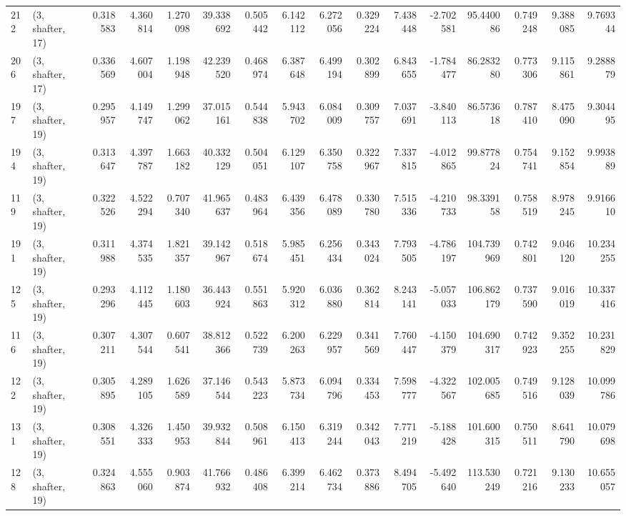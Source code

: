 \begin{tabular}{llrrrrrrrrrrrrrr}
212 &  (3, shafter, 17) &   0.318583 &   4.360814 &  1.270098 &   39.338692 &  0.505442 &   6.142112 &   6.272056 &  0.329224 &   7.438448 &  -2.702581 &   95.440086 &  0.749248 &   9.388085 &   9.769344 \\
206 &  (3, shafter, 17) &   0.336569 &   4.607004 &  1.198948 &   42.239520 &  0.468974 &   6.387648 &   6.499194 &  0.302899 &   6.843655 &  -1.784477 &   86.283280 &  0.773306 &   9.115861 &   9.288879 \\
197 &  (3, shafter, 19) &   0.295957 &   4.149747 &  1.299062 &   37.015161 &  0.544838 &   5.943702 &   6.084009 &  0.309757 &   7.037691 &  -3.840113 &   86.573618 &  0.787410 &   8.475090 &   9.304495 \\
194 &  (3, shafter, 19) &   0.313647 &   4.397787 &  1.663182 &   40.332129 &  0.504051 &   6.129107 &   6.350758 &  0.322967 &   7.337815 &  -4.012865 &   99.877824 &  0.754741 &   9.152854 &   9.993889 \\
119 &  (3, shafter, 19) &   0.322526 &   4.522294 &  0.707340 &   41.965637 &  0.483964 &   6.439356 &   6.478089 &  0.330780 &   7.515336 &  -4.210733 &   98.339158 &  0.758519 &   8.978245 &   9.916610 \\
191 &  (3, shafter, 19) &   0.311988 &   4.374535 &  1.821357 &   39.142967 &  0.518674 &   5.985451 &   6.256434 &  0.343024 &   7.793505 &  -4.786197 &  104.739969 &  0.742801 &   9.046120 &  10.234255 \\
125 &  (3, shafter, 19) &   0.293296 &   4.112445 &  1.180603 &   36.443924 &  0.551863 &   5.920312 &   6.036880 &  0.362814 &   8.243141 &  -5.057033 &  106.862179 &  0.737590 &   9.016019 &  10.337416 \\
116 &  (3, shafter, 19) &   0.307211 &   4.307544 &  0.607541 &   38.812366 &  0.522739 &   6.200263 &   6.229957 &  0.341569 &   7.760447 &  -4.150379 &  104.690317 &  0.742923 &   9.352255 &  10.231829 \\
122 &  (3, shafter, 19) &   0.305895 &   4.289105 &  1.626589 &   37.146544 &  0.543223 &   5.873734 &   6.094796 &  0.334453 &   7.598777 &  -4.322567 &  102.005685 &  0.749516 &   9.128039 &  10.099786 \\
131 &  (3, shafter, 19) &   0.308551 &   4.326333 &  1.450953 &   39.932844 &  0.508961 &   6.150413 &   6.319244 &  0.342043 &   7.771219 &  -5.188428 &  101.600315 &  0.750511 &   8.641790 &  10.079698 \\
128 &  (3, shafter, 19) &   0.324863 &   4.555060 &  0.903874 &   41.766932 &  0.486408 &   6.399214 &   6.462734 &  0.373886 &   8.494705 &  -5.492640 &  113.530249 &  0.721216 &   9.130233 &  10.655057 \\

\end{tabular}

